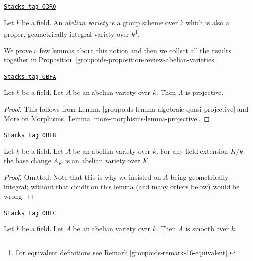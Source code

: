 \begin{definition}
\label{groupoids-definition-abelian-variety}
\href{https://stacks.math.columbia.edu/tag/03RO}{\texttt{Stacks tag 03RO}}

Let $k$ be a field. An {\it abelian variety} is a group scheme over
$k$ which is also a proper, geometrically integral variety over
$k$\footnote{For equivalent definitions see Remark \ref{groupoids-remark-16-equivalent}.}.
\end{definition}

We prove a few lemmas about this notion and then we collect
all the results together in
Proposition \ref{groupoids-proposition-review-abelian-varieties}.

\begin{lemma}
\label{groupoids-lemma-abelian-variety-projective}
\href{https://stacks.math.columbia.edu/tag/0BFA}{\texttt{Stacks tag 0BFA}}

Let $k$ be a field. Let $A$ be an abelian variety over $k$.
Then $A$ is projective.
\end{lemma}

\begin{proof}

This follows from
Lemma \ref{groupoids-lemma-algebraic-quasi-projective} and
More on Morphisms, Lemma \ref{more-morphisms-lemma-projective}.
\end{proof}

\begin{lemma}
\label{groupoids-lemma-abelian-variety-change-field}
\href{https://stacks.math.columbia.edu/tag/0BFB}{\texttt{Stacks tag 0BFB}}

Let $k$ be a field. Let $A$ be an abelian variety over $k$.
For any field extension $K/k$ the base change $A_K$ is an
abelian variety over $K$.
\end{lemma}

\begin{proof}
Omitted. Note that this is why we insisted on $A$ being
geometrically integral; without that condition this lemma
(and many others below) would be wrong.
\end{proof}

\begin{lemma}
\label{groupoids-lemma-abelian-variety-smooth}
\href{https://stacks.math.columbia.edu/tag/0BFC}{\texttt{Stacks tag 0BFC}}

Let $k$ be a field. Let $A$ be an abelian variety over $k$.
Then $A$ is smooth over $k$.
\end{lemma}

